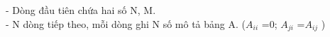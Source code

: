 - Dòng đầu tiên chứa hai số N, M.   
\\   - N dòng tiếp theo, mỗi dòng ghi N số mô tả bảng A. ($A_{ii}$   =0; $A_{ji}$   =$A_{ij}$   )
